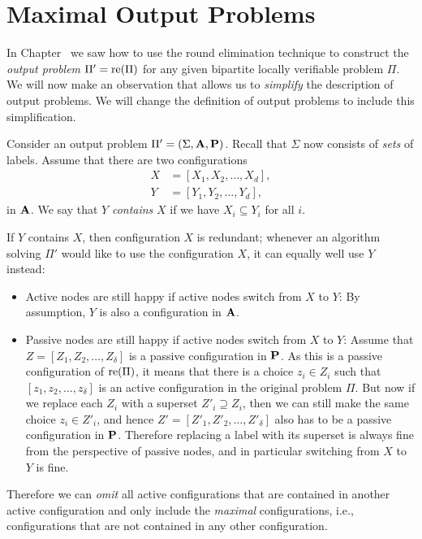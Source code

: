 \section{Maximal Output Problems}\label{sec:re-maximal}

In Chapter~ we saw how to use the round elimination technique to construct the \emph{output problem} $\Pi' = \operatorname{re}(\Pi)$ for any given bipartite locally verifiable problem $\Pi$. We will now make an observation that allows us to \emph{simplify} the description of output problems. We will change the definition of output problems to include this simplification.

Consider an output problem $\Pi' = (\Sigma, \mathbf{A}, \mathbf{P})$. Recall that $\Sigma$ now consists of \emph{sets} of labels. Assume that there are two configurations
\begin{align*}
X &= [X_1, X_2, \dotsc, X_d], \\
Y &= [Y_1, Y_2, \dotsc, Y_d],
\end{align*}
in $\mathbf{A}$. We say that $Y$ \emph{contains} $X$ if we have $X_i \subseteq Y_i$ for all $i$.

If $Y$ contains $X$, then configuration $X$ is redundant; whenever an algorithm solving $\Pi'$ would like to use the configuration $X$, it can equally well use $Y$ instead:
\begin{itemize}
	\item Active nodes are still happy if active nodes switch from $X$ to $Y$: By assumption, $Y$ is also a configuration in $\mathbf{A}$.
	\item Passive nodes are still happy if active nodes switch from $X$ to $Y$: Assume that $Z = [Z_1, Z_2, \dotsc, Z_\delta]$ is a passive configuration in $\mathbf{P}$. As this is a passive configuration of $\operatorname{re}(\Pi)$, it means that there is a choice $z_i \in Z_i$ such that $[z_1, z_2, \dotsc, z_\delta]$ is an active configuration in the original problem $\Pi$. But now if we replace each $Z_i$ with a superset $Z'_i \supseteq Z_i$, then we can still make the same choice $z_i \in Z'_i$, and hence $Z' = [Z'_1, Z'_2, \dotsc, Z'_\delta]$ also has to be a passive configuration in $\mathbf{P}$. Therefore replacing a label with its superset is always fine from the perspective of passive nodes, and in particular switching from $X$ to $Y$ is fine.
\end{itemize}
Therefore we can \emph{omit} all active configurations that are contained in another active configuration and only include the \emph{maximal} configurations, i.e., configurations that are not contained in any other configuration.

